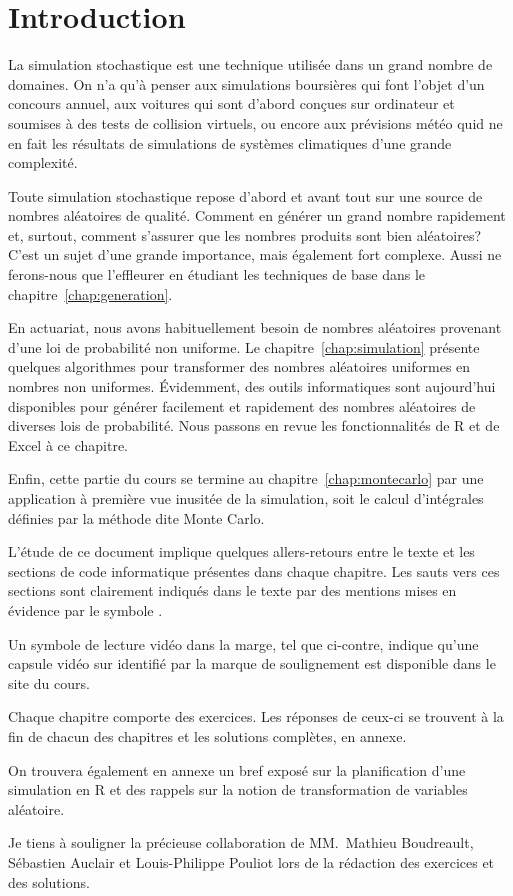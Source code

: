 \chapter*{Introduction}

La simulation stochastique est une technique utilisée dans un grand
nombre de domaines. On n'a qu'à penser aux simulations boursières qui
font l'objet d'un concours annuel, aux voitures qui sont d'abord
conçues sur ordinateur et soumises à des tests de collision virtuels,
ou encore aux prévisions météo quid ne en fait les résultats de
simulations de systèmes climatiques d'une grande complexité.

Toute simulation stochastique repose d'abord et avant tout sur une
source de nombres aléatoires de qualité. Comment en générer un grand
nombre rapidement et, surtout, comment s'assurer que les nombres
produits sont bien aléatoires? C'est un sujet d'une grande importance,
mais également fort complexe. Aussi ne ferons-nous que l'effleurer en
étudiant les techniques de base dans le
chapitre~\ref{chap:generation}.

En actuariat, nous avons habituellement besoin de nombres aléatoires
provenant d'une loi de probabilité non uniforme. Le
chapitre~\ref{chap:simulation} présente quelques algorithmes pour
transformer des nombres aléatoires uniformes en nombres non uniformes.
Évidemment, des outils informatiques sont aujourd'hui disponibles pour
générer facilement et rapidement des nombres aléatoires de diverses
lois de probabilité. Nous passons en revue les fonctionnalités de R et
de Excel à ce chapitre.

Enfin, cette partie du cours se termine au
chapitre~\ref{chap:montecarlo} par une application à première vue
inusitée de la simulation, soit le calcul d'intégrales définies par la
méthode dite Monte Carlo.

L'étude de ce document implique quelques allers-retours entre le texte
et les sections de code informatique présentes dans chaque chapitre.
Les sauts vers ces sections sont clairement indiqués dans le texte par
des mentions mises en évidence par le symbole {\ForwardToEnd}.

Un symbole de lecture vidéo dans la marge, tel que ci-contre, indique
qu'une capsule vidéo sur  identifié par la marque de
soulignement est disponible dans le site du cours.

Chaque chapitre comporte des exercices. Les réponses de ceux-ci se
trouvent à la fin de chacun des chapitres et les solutions complètes,
en annexe.

On trouvera également en annexe un bref exposé sur la planification
d'une simulation en R et des rappels sur la notion de transformation
de variables aléatoire.

Je tiens à souligner la précieuse collaboration de MM.~Mathieu
Boudreault, Sébastien Auclair et Louis-Philippe Pouliot lors de la
rédaction des exercices et des solutions.

